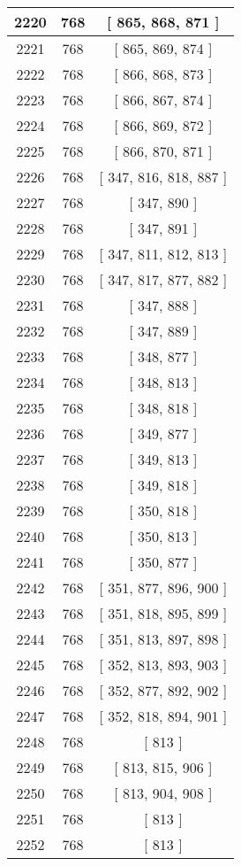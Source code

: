 \begin{center}
\begin{longtable}[H]{|| c c c ||}
\hline
2220 & 768 & [ 865, 868, 871 ] \\ 
\hline
2221 & 768 & [ 865, 869, 874 ] \\ 
\hline
2222 & 768 & [ 866, 868, 873 ] \\ 
\hline
2223 & 768 & [ 866, 867, 874 ] \\ 
\hline
2224 & 768 & [ 866, 869, 872 ] \\ 
\hline
2225 & 768 & [ 866, 870, 871 ] \\ 
\hline
2226 & 768 & [ 347, 816, 818, 887 ] \\ 
\hline
2227 & 768 & [ 347, 890 ] \\ 
\hline
2228 & 768 & [ 347, 891 ] \\ 
\hline
2229 & 768 & [ 347, 811, 812, 813 ] \\ 
\hline
2230 & 768 & [ 347, 817, 877, 882 ] \\ 
\hline
2231 & 768 & [ 347, 888 ] \\ 
\hline
2232 & 768 & [ 347, 889 ] \\ 
\hline
2233 & 768 & [ 348, 877 ] \\ 
\hline
2234 & 768 & [ 348, 813 ] \\ 
\hline
2235 & 768 & [ 348, 818 ] \\ 
\hline
2236 & 768 & [ 349, 877 ] \\ 
\hline
2237 & 768 & [ 349, 813 ] \\ 
\hline
2238 & 768 & [ 349, 818 ] \\ 
\hline
2239 & 768 & [ 350, 818 ] \\ 
\hline
2240 & 768 & [ 350, 813 ] \\ 
\hline
2241 & 768 & [ 350, 877 ] \\ 
\hline
2242 & 768 & [ 351, 877, 896, 900 ] \\ 
\hline
2243 & 768 & [ 351, 818, 895, 899 ] \\ 
\hline
2244 & 768 & [ 351, 813, 897, 898 ] \\ 
\hline
2245 & 768 & [ 352, 813, 893, 903 ] \\ 
\hline
2246 & 768 & [ 352, 877, 892, 902 ] \\ 
\hline
2247 & 768 & [ 352, 818, 894, 901 ] \\ 
\hline
2248 & 768 & [ 813 ] \\ 
\hline
2249 & 768 & [ 813, 815, 906 ] \\ 
\hline
2250 & 768 & [ 813, 904, 908 ] \\ 
\hline
2251 & 768 & [ 813 ] \\ 
\hline
2252 & 768 & [ 813 ] \\ 

\end{longtable}
\end{center}
